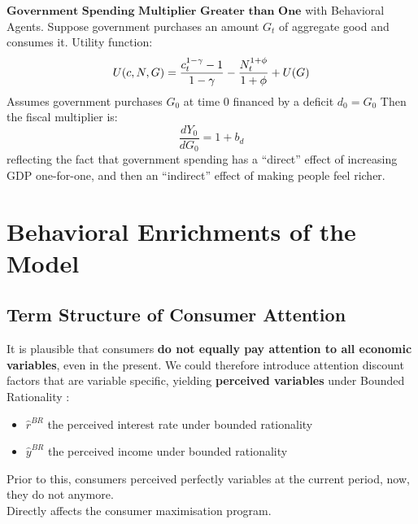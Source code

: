 \documentclass{beamer}
\newcommand\ReduceFont{\fontsize{10}{7.2}\selectfont}
\begin{document}
\begin{frame}{\subsecname}
    $\textbf{Government Spending Multiplier Greater than One}$ with Behavioral Agents. Suppose government purchases an amount $G_{t}$ of aggregate good and consumes it. Utility function:
    \begin{equation}\notag
        U(c,N,G) = \frac{c_{t}^{1-\gamma}-1}{1-\gamma} - \frac{N_{t}^{1+\phi}}{1+\phi}+U(G)
    \end{equation}
    Assumes government purchases $G_{0}$ at time 0 financed by a deficit $d_{0}=G_{0}$
    Then the fiscal multiplier is:
    \begin{equation}\tag{48}
        \frac{d Y_{0}}{d G_{0}}=1+b_{d}
    \end{equation}
    reflecting the fact that government spending has a “direct” effect of increasing GDP one-for-one, and then an “indirect” effect of making people feel richer.
\end{frame}


\section{Behavioral Enrichments of the Model}

\begin{frame}
    \ReduceFont
\end{frame}

\begin{frame}
    \tableofcontents[currentsection, hideothersubsections, sections=\value{section}]
\end{frame}

\subsection{Term Structure of Consumer Attention}
\begin{frame}{\subsecname}
    It is plausible that consumers \textbf{do not equally pay attention to all economic variables}, even in the present. 
    We could therefore introduce attention discount factors that are variable specific, yielding \textbf{perceived variables} under Bounded Rationality : 
    \begin{itemize}
        \item $\hat{r}^{BR}$ the perceived interest rate under bounded rationality
        \item $\hat{y}^{BR}$ the perceived income under bounded rationality
    \end{itemize}
    Prior to this, consumers perceived perfectly variables at the current period, now, they do not anymore. \\
    \hfill \linebreak
    Directly affects the consumer maximisation program. 
\end{frame}
    
\end{document}
